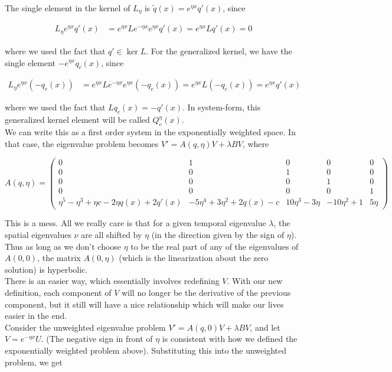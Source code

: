 \documentclass[12pt]{article}
\begin{document}
The single element in the kernel of $L_\eta$ is $\tilde{q}(x) = e^{\eta x} q'(x)$, since

\begin{align*}
L_\eta e^{\eta x} q'(x) &= e^{\eta x} L e^{-\eta x} e^{\eta x} q'(x) = e^{\eta x} L q'(x) = 0
\end{align*}

where we used the fact that $q' \in \ker L$. For the generalized kernel, we have the single element $-e^{\eta x} q_c(x)$, since

\begin{align*}
L_\eta e^{\eta x} (-q_c(x)) &= e^{\eta x} L e^{-\eta x} e^{\eta x} (-q_c(x)) = e^{\eta x} L (-q_c(x)) = e^{\eta x} q'(x)
\end{align*}

where we used the fact that $L q_c(x) = -q'(x)$. In system-form, this generalized kernel element will be called $Q^\eta_c(x)$.\\

We can write this as a first order system in the exponentially weighted space. In that case, the eigenvalue problem becomes $V' = A(q, \eta)V + \lambda B V$, where

\[
A(q, \eta) = 
\begin{pmatrix}0 & 1 & 0 & 0 & 0 \\0 & 0 & 1 & 0 & 0 \\0 & 0 & 0 & 1 & 0 \\0 & 0 & 0 & 0 & 1 \\
\eta^5 - \eta^3 + \eta c - 2 \eta q(x) + 2q'(x) & -5\eta^4 + 3\eta^2 + 2q(x) - c & 10\eta^3 - 3\eta & -10\eta^2 + 1 & 5\eta \end{pmatrix} 
\]

This is a mess. All we really care is that for a given temporal eigenvalue $\lambda$, the spatial eigenvalues $\nu$ are all shifted by $\eta$ (in the direction given by the sign of $\eta$). Thus as long as we don't choose $\eta$ to be the real part of any of the eigenvalues of $A(0, 0)$, the matrix $A(0, \eta)$ (which is the linearization about the zero solution) is hyperbolic.\\

There is an easier way, which essentially involves redefining $V$. With our new definition, each component of $V$ will no longer be the derivative of the previous component, but it still will have a nice relationship which will make our lives easier in the end.\\

Consider the unweighted eigenvalue problem $V' = A(q, 0)V + \lambda B V$, and let $V = e^{-\eta x} U$. (The negative sign in front of $\eta$ is consistent with how we defined the exponentially weighted problem above). Substituting this into the unweighted problem, we get
\end{document}

